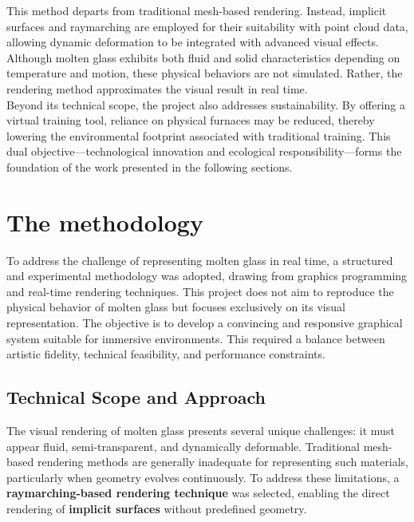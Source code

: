 \documentclass{rapportcs}
\begin{document}
    This method departs from traditional mesh-based rendering. Instead, implicit surfaces and raymarching are employed for their suitability with point cloud data, allowing dynamic deformation to be integrated with advanced visual effects. Although molten glass exhibits both fluid and solid characteristics depending on temperature and motion, these physical behaviors are not simulated. Rather, the rendering method approximates the visual result in real time. \\
    
    Beyond its technical scope, the project also addresses sustainability. By offering a virtual training tool, reliance on physical furnaces may be reduced, thereby lowering the environmental footprint associated with traditional training. This dual objective—technological innovation and ecological responsibility—forms the foundation of the work presented in the following sections.

\newpage

\section{The methodology}

    To address the challenge of representing molten glass in real time, a structured and experimental methodology was adopted, drawing from graphics programming and real-time rendering techniques. This project does not aim to reproduce the physical behavior of molten glass but focuses exclusively on its visual representation. The objective is to develop a convincing and responsive graphical system suitable for immersive environments. This required a balance between artistic fidelity, technical feasibility, and performance constraints.

    \subsection{Technical Scope and Approach}
    
        The visual rendering of molten glass presents several unique challenges: it must appear fluid, semi-transparent, and dynamically deformable. Traditional mesh-based rendering methods are generally inadequate for representing such materials, particularly when geometry evolves continuously. To address these limitations, a \textbf{raymarching-based rendering technique} was selected, enabling the direct rendering of \textbf{implicit surfaces} without predefined geometry. \\
        
\end{document}
